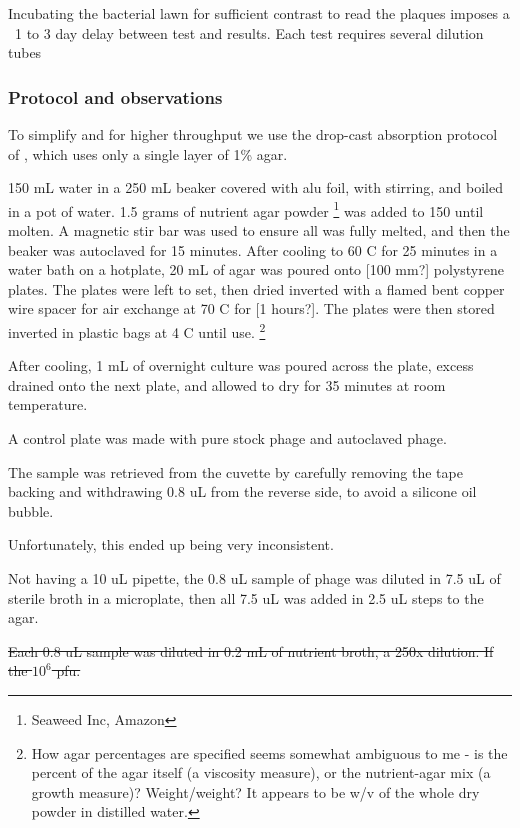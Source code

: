 \documentclass[paper.tex]{subfiles}
\begin{document}
Incubating the bacterial lawn for sufficient contrast to read the plaques imposes a ~1 to 3 day delay between test and results. Each test requires several dilution tubes

\subsubsection{Protocol and observations}

\begin{toolchain}

To simplify and for higher throughput we use the drop-cast absorption protocol of \cite{Simple2018}, which uses only a single layer of 1\% agar.

150 mL water in a 250 mL beaker covered with alu foil, with stirring, and boiled in a pot of water. 1.5 grams of nutrient agar powder \footnote{Seaweed Inc, Amazon} was added to 150  until molten. A magnetic stir bar was used to ensure all was fully melted,
and then the beaker was autoclaved for 15 minutes. After cooling to 60 C for 25 minutes in a water bath on a hotplate, 20 mL of agar was poured onto [100 mm?] polystyrene plates. The plates were left to set, then dried inverted with a flamed bent copper wire spacer for air exchange at 70 C for [1 hours?].
The plates were then stored inverted in plastic bags at 4 C until use.
\footnote{How agar percentages are specified seems somewhat ambiguous to me - is the percent of the agar itself (a viscosity measure), or the nutrient-agar mix (a growth measure)?
	Weight/weight? It appears to be w/v of the whole dry powder in distilled water.}

After cooling, 1 mL of overnight culture was poured across the plate, excess drained onto the next plate, and allowed to dry for 35 minutes at room temperature.

A control plate was made with pure stock phage and autoclaved phage.

The sample was retrieved from the cuvette by carefully removing the tape backing and withdrawing 0.8 uL from the reverse side, to avoid a silicone oil bubble.

Unfortunately, this ended up being very inconsistent.

Not having a 10 uL pipette, the 0.8 uL sample of phage was diluted in 7.5 uL of sterile broth in a microplate, then all 7.5 uL was added in 2.5 uL steps to the agar.

\st{Each 0.8 uL sample was diluted in 0.2 mL of nutrient broth, a 250x dilution. If the $10^6$ pfu.}


\end{toolchain}
\end{document}
